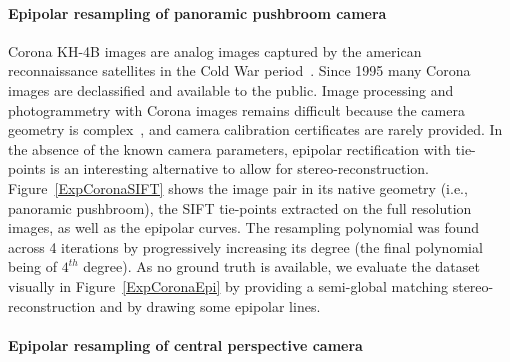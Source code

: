 \documentclass{ipol}
\begin{document}
\paragraph{Epipolar resampling of panoramic pushbroom camera}
%
Corona KH-4B images are analog images captured by the american reconnaissance satellites in the Cold War period~\cite{madden1996corona}. Since 1995 many Corona images are declassified and available to the public. Image processing and photogrammetry with Corona images remains difficult because the camera geometry is complex~\cite{sohn2004mathematical}, and camera calibration certificates are rarely provided. In the absence of the known camera parameters, epipolar rectification with tie-points is an interesting alternative to allow for stereo-reconstruction. Figure~\ref{ExpCoronaSIFT} shows the image pair in its native geometry (i.e., panoramic pushbroom), the SIFT tie-points extracted on the full resolution images, as well as the epipolar curves. The resampling polynomial was found across 4 iterations by progressively increasing its degree (the final polynomial being of $4^{th}$ degree). As no ground truth is available, we evaluate the dataset visually in Figure~\ref{ExpCoronaEpi} by providing a semi-global matching stereo-reconstruction and by drawing some epipolar lines.  



\paragraph{Epipolar resampling of central perspective camera}

 
\end{document}
